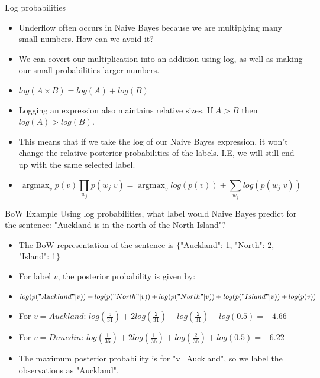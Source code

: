 \documentclass[aspectratio=169, 10pt]{beamer}
\DeclareMathOperator*{\argmax}{argmax}
\begin{document}
\begin{frame}{Log probabilities}
\begin{itemize}
    \item Underflow often occurs in Naive Bayes because we are multiplying many small numbers. How can we avoid it?
    \item We can covert our multiplication into an addition using log, as well as making our small probabilities larger numbers.
    \item $log(A\times B) = log(A) + log(B)$
    \item Logging an expression also maintains relative sizes. If $A > B$ then $log(A) > log(B)$.
    \item This means that if we take the log of our Naive Bayes expression, it won't change the relative posterior probabilities of the labels. I.E, we will still end up with the same selected label.
    \item $$\argmax_{v} p(v)\prod_{w_j}p(w_j|v) = \argmax_{v} log(p(v)) + \sum_{w_j}log(p(w_j|v))$$
\end{itemize}
\end{frame}

\begin{frame}{BoW Example}
    Using log probabilities, what label would Naive Bayes predict for the sentence: "Auckland is in the north of the North Island"?
    \pause
    \begin{itemize}
        \item The BoW representation of the sentence is $\{$"Auckland": 1, "North": 2, "Island": 1$\}$
        \item For label $v$, the posterior probability is given by:
        \item $log(p("Auckland"|v)) + log(p("North"|v)) + log(p("North"|v)) + log(p("Island"|v)) + log(p(v))$
        \pause
        \item For $v=Auckland$: $log(\frac{5}{31}) + 2log(\frac{2}{31}) + log(\frac{2}{31}) + log(0.5) = -4.66$
        \item For $v=Dunedin$: $log(\frac{1}{36}) + 2log(\frac{1}{36}) + log(\frac{2}{36}) + log(0.5) = -6.22$
        \item The maximum posterior probability is for "v=Auckland", so we label the observations as "Auckland".
    \end{itemize}
\end{frame}
    
\end{document}
